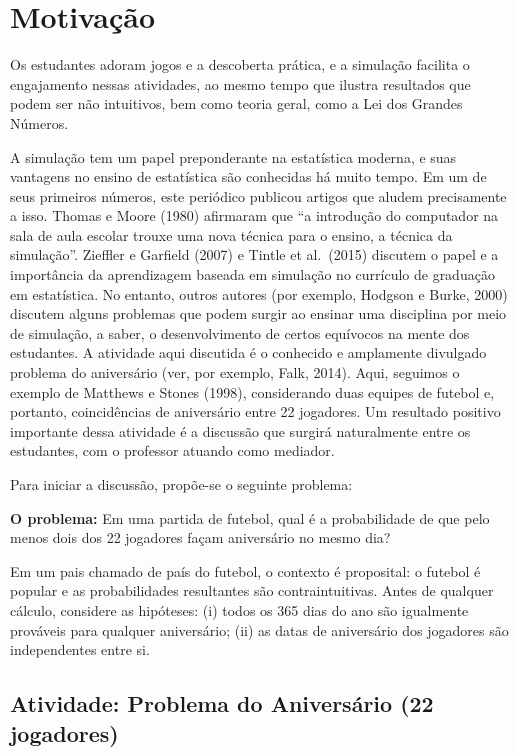 \documentclass[
  letterpaper,
  DIV=11,
  numbers=noendperiod]{scrreprt}
\begin{document}
\chapter{Motivação}\label{motivauxe7uxe3o}

Os estudantes adoram jogos e a descoberta prática, e a simulação
facilita o engajamento nessas atividades, ao mesmo tempo que ilustra
resultados que podem ser não intuitivos, bem como teoria geral, como a
Lei dos Grandes Números.

A simulação tem um papel preponderante na estatística moderna, e suas
vantagens no ensino de estatística são conhecidas há muito tempo. Em um
de seus primeiros números, este periódico publicou artigos que aludem
precisamente a isso. Thomas e Moore (1980) afirmaram que ``a introdução
do computador na sala de aula escolar trouxe uma nova técnica para o
ensino, a técnica da simulação''. Zieffler e Garfield (2007) e Tintle et
al.~(2015) discutem o papel e a importância da aprendizagem baseada em
simulação no currículo de graduação em estatística. No entanto, outros
autores (por exemplo, Hodgson e Burke, 2000) discutem alguns problemas
que podem surgir ao ensinar uma disciplina por meio de simulação, a
saber, o desenvolvimento de certos equívocos na mente dos estudantes. A
atividade aqui discutida é o conhecido e amplamente divulgado problema
do aniversário (ver, por exemplo, Falk, 2014). Aqui, seguimos o exemplo
de Matthews e Stones (1998), considerando duas equipes de futebol e,
portanto, coincidências de aniversário entre 22 jogadores. Um resultado
positivo importante dessa atividade é a discussão que surgirá
naturalmente entre os estudantes, com o professor atuando como mediador.

Para iniciar a discussão, propõe-se o seguinte problema:

\textbf{O problema:} Em uma partida de futebol, qual é a probabilidade
de que pelo menos dois dos 22 jogadores façam aniversário no mesmo dia?

Em um pais chamado de país do futebol, o contexto é proposital: o
futebol é popular e as probabilidades resultantes são contraintuitivas.
Antes de qualquer cálculo, considere as hipóteses: (i) todos os 365 dias
do ano são igualmente prováveis para qualquer aniversário; (ii) as datas
de aniversário dos jogadores são independentes entre si.

\section{Atividade: Problema do Aniversário (22
jogadores)}\label{atividade-problema-do-aniversuxe1rio-22-jogadores}
\end{document}
